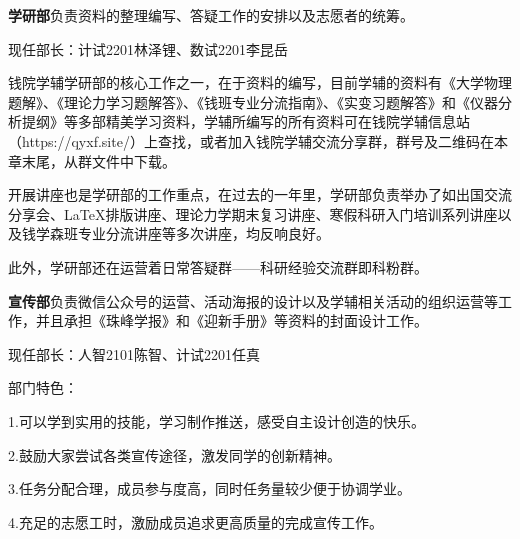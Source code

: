 \documentclass[
decoration,  %
]{qyxf-book}
\begin{document}
	\textbf{学研部}负责资料的整理编写、答疑工作的安排以及志愿者的统筹。
	
	现任部长：计试2201林泽锂、数试2201李昆岳
	
	钱院学辅学研部的核心工作之一，在于资料的编写，目前学辅的资料有《大学物理题解》、《理论力学习题解答》、《钱班专业分流指南》、《实变习题解答》和《仪器分析提纲》等多部精美学习资料，学辅所编写的所有资料可在钱院学辅信息站（https://qyxf.site/）上查找，或者加入钱院学辅交流分享群，群号及二维码在本章末尾，从群文件中下载。
	
	开展讲座也是学研部的工作重点，在过去的一年里，学研部负责举办了如出国交流分享会、LaTeX排版讲座、理论力学期末复习讲座、寒假科研入门培训系列讲座以及钱学森班专业分流讲座等多次讲座，均反响良好。
	
	此外，学研部还在运营着日常答疑群——科研经验交流群即科粉群。
	
	\textbf{宣传部}负责微信公众号的运营、活动海报的设计以及学辅相关活动的组织运营等工作，并且承担《珠峰学报》和《迎新手册》等资料的封面设计工作。
	
	现任部长：人智2101陈智、计试2201任真
	
	部门特色：
	
	1.可以学到实用的技能，学习制作推送，感受自主设计创造的快乐。
	
	2.鼓励大家尝试各类宣传途径，激发同学的创新精神。
	
	3.任务分配合理，成员参与度高，同时任务量较少便于协调学业。
	
	4.充足的志愿工时，激励成员追求更高质量的完成宣传工作。
	
\end{document}
